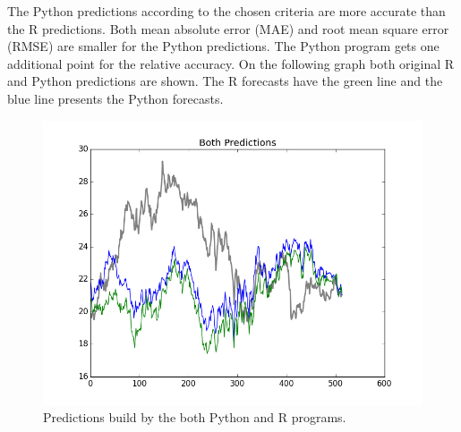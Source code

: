 \documentclass[
  twoside,
  11pt, a4paper,
  footinclude=true,
  headinclude=true,
  cleardoublepage=empty
]{scrreprt}
\begin{document}
    The Python predictions according to the chosen criteria are more accurate than the R predictions. Both mean absolute error (MAE) and root mean square error (RMSE) are smaller for the Python predictions. The Python program gets one additional point for the relative accuracy. On the following graph both original R and Python predictions are shown. The R forecasts have the green line and the blue line presents the Python forecasts.
    
    \begin{figure}[H]
        \includegraphics[scale=0.5]{BothPredictions.png}
        \centering
        \caption{Predictions build by the both Python and R programs.}
        \label{fig:BothPredictions}
    \end{figure}
    
\end{document}
